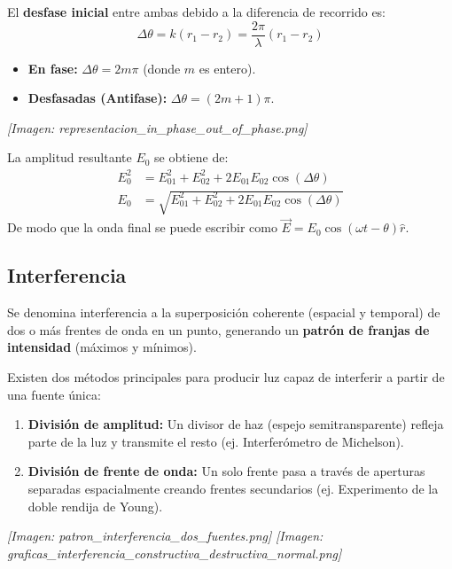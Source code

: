 \documentclass[12pt]{article}
\begin{document}
	El \textbf{desfase inicial} entre ambas debido a la diferencia de recorrido es:
	\begin{equation*}
		\Delta\theta = k(r_1 - r_2) = \frac{2\pi}{\lambda}(r_1 - r_2)
	\end{equation*}
	
	\begin{itemize}
		\item \textbf{En fase:} $\Delta\theta = 2m\pi$ (donde $m$ es entero).
		\item \textbf{Desfasadas (Antifase):} $\Delta\theta = (2m+1)\pi$.
	\end{itemize}
	\textit{[Imagen: representacion\_in\_phase\_out\_of\_phase.png]}
	
	La amplitud resultante $E_0$ se obtiene de:
	\begin{align*}
		E_0^2 &= E_{01}^2 + E_{02}^2 + 2E_{01}E_{02}\cos(\Delta\theta) \\
		E_0 &= \sqrt{E_{01}^2 + E_{02}^2 + 2E_{01}E_{02}\cos(\Delta\theta)}
	\end{align*}
	De modo que la onda final se puede escribir como $\vec{E} = E_0 \cos(\omega t - \theta)\hat{r}$.
	
	\subsection{Interferencia}
	Se denomina interferencia a la superposición coherente (espacial y temporal) de dos o más frentes de onda en un punto, generando un \textbf{patrón de franjas de intensidad} (máximos y mínimos). 
	
	Existen dos métodos principales para producir luz capaz de interferir a partir de una fuente única:
	\begin{enumerate}
		\item \textbf{División de amplitud:} Un divisor de haz (espejo semitransparente) refleja parte de la luz y transmite el resto (ej. Interferómetro de Michelson).
		\item \textbf{División de frente de onda:} Un solo frente pasa a través de aperturas separadas espacialmente creando frentes secundarios (ej. Experimento de la doble rendija de Young).
	\end{enumerate}
	
	\textit{[Imagen: patron\_interferencia\_dos\_fuentes.png]}
	\textit{[Imagen: graficas\_interferencia\_constructiva\_destructiva\_normal.png]}
	
\end{document}
